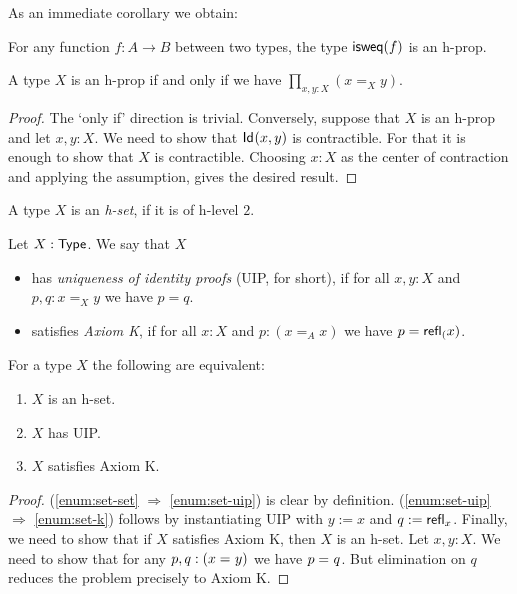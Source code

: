 As an immediate corollary we obtain:

\begin{cor}
 For any function $f \colon A \to B$ between two types, the type $\mathsf{isweq}(f)$ is an h-prop.
\end{cor}

\begin{thm}
 A type $X$ is an h-prop if and only if we have $\prod\limits_{x, y : X} (x =_X y)$.
\end{thm}

\begin{proof}
 The `only if' direction is trivial. Conversely, suppose that $X$ is an h-prop and let $x, y : X$. We need to show that $\mathsf{Id}_{}(x,y)$ is contractible. For that it is enough to show that $X$ is contractible. Choosing $x : X$ as the center of contraction and applying the assumption, gives the desired result.
\end{proof}

\begin{defn}
 A type $X$ is an {\em h-set}, if it is of h-level $2$.
\end{defn}

\begin{defn}
 Let $X : \mathsf{Type}$. We say that $X$
 \begin{itemize}
  \item has {\em uniqueness of identity proofs} (UIP, for short), if for all $x, y : X$ and $p, q : x =_X y$ we have $p = q$.
  \item satisfies {\em Axiom K}, if for all $x : X$ and $p : (x =_A x)$ we have $p = \mathsf{refl}_{(} x)$.
 \end{itemize}
\end{defn}

\begin{thm}\label{thm:h-set-uip-K}
 For a type $X$ the following are equivalent:
 \begin{enumerate}
  \item\label{enum:set-set} $X$ is an h-set.
  \item\label{enum:set-uip} $X$ has UIP.
  \item\label{enum:set-k} $X$ satisfies Axiom K.
 \end{enumerate}
\end{thm}

\begin{proof} (\ref{enum:set-set} $\Rightarrow$ \ref{enum:set-uip}) is clear by definition. (\ref{enum:set-uip} $\Rightarrow$ \ref{enum:set-k}) follows by instantiating UIP with $y := x$ and $q := \mathsf{refl}_{x}$.
Finally, we need to show that if $X$ satisfies Axiom K, then $X$ is an h-set. Let $x, y : X$. We need to show that for any $p, q : (x =_{} y)$ we have $p =_{} q$. But elimination on $q$ reduces the problem precisely to Axiom K.
\end{proof}

